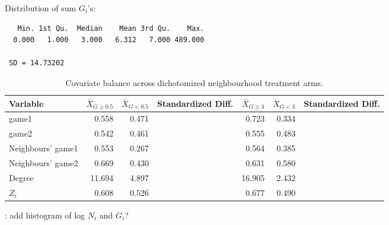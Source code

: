 \documentclass[10pt]{article}
\begin{document}
Distribution of sum $G_i$'s:
\begin{verbatim}
   Min. 1st Qu.  Median    Mean 3rd Qu.    Max. 
  0.000   1.000   3.000   6.312   7.000 489.000 
  
 SD = 14.73202
\end{verbatim}

\begin{table}[H]
\centering
\begin{tabular}{@{}lrrrrrr@{}}
\toprule
Variable & $\bar{X}_{G\geq0.5}$ & $\bar{X}_{G<0.5}$ & Standardized Diff. & $\bar{X}_{G\geq3}$ & $\bar{X}_{G<3}$ & Standardized Diff. \\
\midrule
game1 & 0.558 & 0.471 & & 0.723 & 0.334 & \\
game2 & 0.542 & 0.461 & & 0.555 & 0.483 & \\
Neighbours' game1 & 0.553 & 0.267 & & 0.564 & 0.385 & \\
Neighbours' game2 & 0.669 & 0.430 & & 0.631 & 0.580 & \\
Degree & 11.694 & 4.897 & & 16.905 & 2.432 & \\
$Z_i$ & 0.608 & 0.526 & & 0.677 & 0.490 & \\
\bottomrule
\end{tabular}
\caption{Covariate balance across dichotomized neighbourhood treatment arms.}
\end{table}

\todo: add histogram of log $N_i$ and $G_i$?
\end{document}
